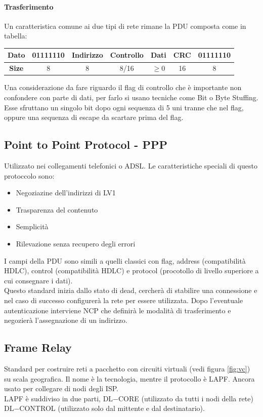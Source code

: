 \documentclass[12pt]{article}
\begin{document}
\paragraph{Trasferimento}
Un caratteristica comune ai due tipi di rete rimane la PDU composta come in tabella:
\begin{center}
  \begin{tabular}{ |c||c|c|c|c|c|c| }
    \hline
    \textbf{Dato} & 01111110 & Indirizzo & Controllo & Dati & CRC & 01111110 \\
    \hline
    \textbf{Size} & 8 & 8 & 8/16 & $\geq 0$ & 16 & 8\\
    \hline
  \end{tabular}
\end{center}
Una considerazione da fare riguardo il flag di controllo che è importante non confondere con parte di dati, per farlo si usano tecniche come Bit o Byte Stuffing. Esse sfruttano un singolo bit dopo ogni sequenza di 5 uni tranne che nel flag, oppure una sequenza di escape da scartare prima del flag.
\subsection{Point to Point Protocol - PPP}
Utilizzato nei collegamenti telefonici o ADSL. Le caratteristiche speciali di questo protoccolo sono:
\begin{itemize}
  \item Negoziazine dell'indirizzi di LV1
  \item Trasparenza del contenuto
  \item Semplicità
  \item Rilevazione senza recupero degli errori
\end{itemize}
I campi della PDU sono simili a quelli classici con flag, address (compatibilità HDLC), control (compatibilità HDLC) e protocol (procotollo di livello superiore a cui consegnare i dati).\\
Questo standard inizia dallo stato di dead, cercherà di stabilire una connessione e nel caso di successo configurerà la rete per essere utilizzata. Dopo l'eventuale autenticazione interviene NCP che definirà le modalità di trasferimento e negozierà l'assegnazione di un indirizzo.

\subsection{Frame Relay}
Standard per costruire reti a pacchetto con circuiti virtuali (vedi figura \ref{fig:vc}) su scala geografica. Il nome è la tecnologia, mentre il protocollo è LAPF. Ancora usato per collegare di nodi degli ISP.\\
LAPF è suddiviso in due parti, DL$-$CORE (utilizzato da tutti i nodi della rete) DL$-$CONTROL (utilizzato solo dal mittente e dal destinatario).
\end{document}
